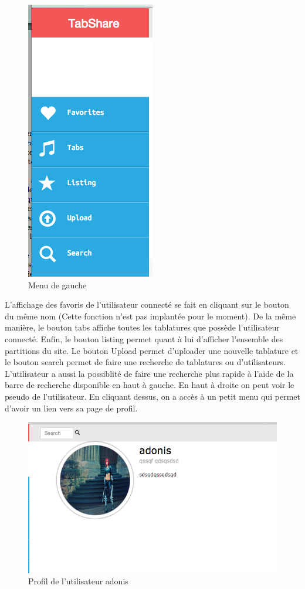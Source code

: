 \begin{figure}[H]
\centering
\includegraphics[scale=0.5]{leftWEB}
\caption{Menu de gauche}
\end{figure}

L'affichage des favoris de l'utilisateur connecté se fait en cliquant sur le bouton du même nom (Cette fonction n'est pas implantée pour le moment). De la même manière, le bouton tabs affiche toutes les tablatures que possède l'utilisateur connecté. Enfin, le bouton listing permet quant à lui d'afficher l'ensemble des partitions du site. Le bouton Upload permet d'uploader une nouvelle tablature et le bouton search permet de faire une recherche de tablatures ou d'utilisateurs. L'utilisateur a aussi la possiblité de faire une recherche plus rapide à l'aide de la barre de recherche disponible en haut à gauche. En haut à droite on peut voir le pseudo de l'utilisateur. En cliquant dessus, on a accès à un petit menu qui permet d'avoir un lien vers sa page de profil. \\

\begin{figure}[H]
\centering
\includegraphics[scale=0.5]{centerWEB}
\caption{Profil de l'utilisateur adonis}
\end{figure}

